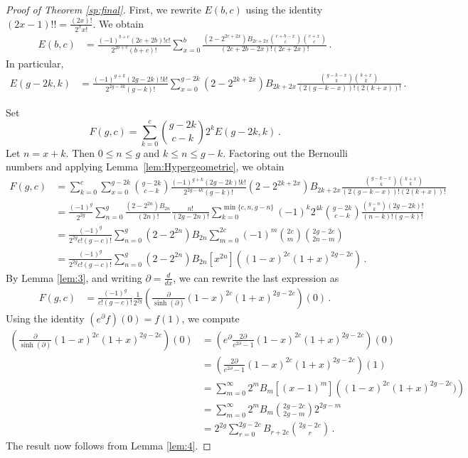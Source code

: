 \documentclass[11pt]{article}
\theoremstyle{definition}
\begin{document}
\begin{proof}[Proof of Theorem \ref{sp:final}]
    First, we rewrite $E(b,c)$ using the identity $(2x-1)!! = \frac{(2x)!}{2^xx!}$. We obtain
    \begin{align*}
        E(b,c)
        &=\frac{(-1)^{b+c}(2c+2b)!c!}{2^{2b+c}(b+c)!}\sum_{x=0}^b\frac{(2-2^{2c+2x})B_{2c+2x}\binom{c+b-x}{c}\binom{c+x}{c}}{(2c+2b-2x)!(2c+2x)!}\,.
    \end{align*}
    In particular,
    \begin{align*}
        E(g-2k,k) &=\frac{(-1)^{g+k}(2g-2k)!k!}{2^{2g-3k}(g-k)!}\sum_{x=0}^{g-2k}(2-2^{2k+2x})B_{2k+2x}\frac{\binom{g-k-x}{k}\binom{k+x}{k}}{(2(g-k-x))!(2(k+x))!}\,.
    \end{align*}

    Set
    $$
    F(g,c) = \sum_{k=0}^c \binom{g-2k}{c-k} 2^{k} E(g-2k,k)\,.
    $$
    Let $n=x+k$. Then $0 \le n \le g$ and $k \le n \le g-k$. Factoring out the Bernoulli numbers and applying Lemma~\ref{lem:Hypergeometric}, we obtain
    \begin{align*}
        F(g,c) &=\sum_{k=0}^{c}\sum_{x=0}^{g-2k}\binom{g-2k}{c-k}\frac{(-1)^{g+k}(2g-2k)!k!}{2^{2g-4k}(g-k)!}(2-2^{2k+2x})B_{2k+2x}\frac{\binom{g-k-x}{k}\binom{k+x}{k}}{(2(g-k-x))!(2(k+x))!}\\
        &=\frac{(-1)^g}{2^{2g}}\sum_{n=0}^g\frac{(2-2^{2n})B_{2n}}{(2n)!}\frac{n!}{(2g-2n)!}\sum_{k=0}^{\min\{c,n, g-n\}}(-1)^k2^{4k}\binom{g-2k}{c-k}\frac{\binom{g-n}{k}(2g-2k)!}{(n-k)!(g-k)!}\\
        &=\frac{(-1)^g}{2^{2g}c!(g-c)!}\sum_{n=0}^g(2-2^{2n})B_{2n}\sum_{m=0}^{2c}(-1)^m\binom{2c}{m}\binom{2g-2c}{2n-m}\\
        &=\frac{(-1)^g}{2^{2g}c!(g-c)!}\sum_{n=0}^g(2-2^{2n})B_{2n}[x^{2n}]\left((1-x)^{2c}(1+x)^{2g-2c}\right)\,.
    \end{align*}
    By Lemma \ref{lem:3}, and writing $\partial=\frac{d}{dx}$, we can rewrite the last expression as
    \begin{align*}
        F(g,c) &= \frac{(-1)^g}{c!(g-c)!}\frac{1}{2^{2g}}\left(\frac{\partial}{\sinh (\partial)}(1-x)^{2c}(1+x)^{2g-2c}\right)(0)\, .
    \end{align*}
    Using the identity $(e^{\partial }f)(0) = f(1)$, we compute
    \begin{align*}
        \left(\frac{\partial}{\sinh (\partial)}(1-x)^{2c}(1+x)^{2g-2c}\right)(0)&=\left(e^{\partial}\frac{2\partial}{e^{2\partial}-1}(1-x)^{2c}(1+x)^{2g-2c}\right)(0)\\
        &=\left(\frac{2\partial}{e^{2\partial}-1}(1-x)^{2c}(1+x)^{2g-2c}\right)(1)\\
        &=\sum_{m=0}^{\infty}2^{m}B_{m}[(x-1)^m]\left((1-x)^{2c}(1+x)^{2g-2c})\right)\\
        &=\sum_{m=0}^{\infty}2^mB_{m}\binom{2g-2c}{2g-m}2^{2g-m}\\
        &=2^{2g}\sum_{r=0}^{2g-2c} B_{r+2c}\binom{2g-2c}{r}\,.
    \end{align*}
    The result now follows from Lemma \ref{lem:4}.
\end{proof}
\end{document}
